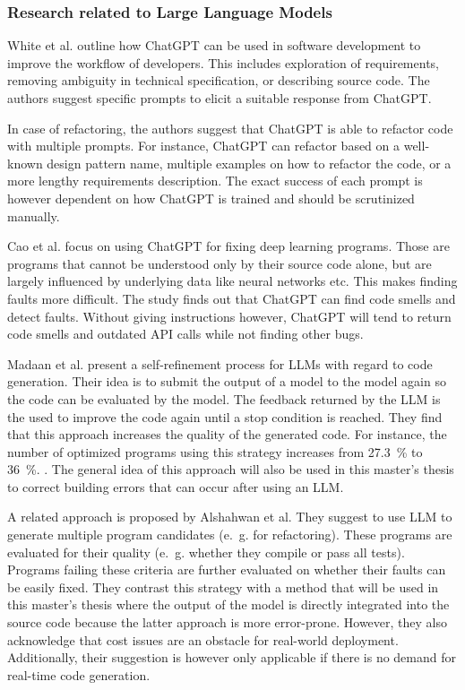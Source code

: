 \subsubsection{Research related to Large Language Models}

White et al. \cite{White2024} outline how ChatGPT can be used in software development to improve the workflow of developers. This includes  exploration of requirements, removing ambiguity in technical specification, or describing source code. The authors suggest specific prompts to elicit a suitable response from ChatGPT.

In case of refactoring, the authors suggest that ChatGPT is able to refactor code with multiple prompts. For instance, ChatGPT can refactor based on a well-known design pattern name, multiple examples on how to refactor the code, or a more lengthy requirements description. The exact success of each prompt is however dependent on how ChatGPT is trained and should be scrutinized manually. 

Cao et al. \cite{cao2023study} focus on using ChatGPT for fixing deep learning programs. Those are programs that cannot be understood only by their source code alone, but are largely influenced by underlying data like  neural networks etc. This makes finding faults more difficult. The study finds out that ChatGPT can find code smells and detect faults. Without giving instructions however, ChatGPT will tend to return code smells and outdated API calls while not finding other bugs. 


Madaan et al. present a self-refinement process for \acp{LLM} with regard to code generation. Their idea is to submit the output of a model to the model again so the code can be evaluated by the model. The feedback returned by the \ac{LLM} is the used to improve the code again until a stop condition is reached. They find that this approach increases the quality of the generated code. For instance, the number of optimized programs using this strategy increases from 27.3~\% to 36~\%. \cite{Madaan2023SelfRefineIR}. 
The general idea of this approach will also be used in this master's thesis to correct building errors that can occur after using an \ac{LLM}. 

A related approach is proposed by Alshahwan et al. They suggest to use \ac{LLM} to generate multiple program candidates (e.~g. for refactoring). These programs are evaluated for their quality (e.~g. whether they compile or pass all tests). Programs failing these criteria are further evaluated on whether their faults can be easily fixed. They contrast this strategy with a method that will be used in this master's thesis where the output of the model is directly integrated into the source code because the latter approach is more error-prone. However, they also acknowledge that cost issues are an obstacle for real-world deployment.
Additionally, their suggestion is however only applicable if there is no demand for real-time code generation. \cite{alshahwan2024assuredllmbasedsoftwareengineering}


